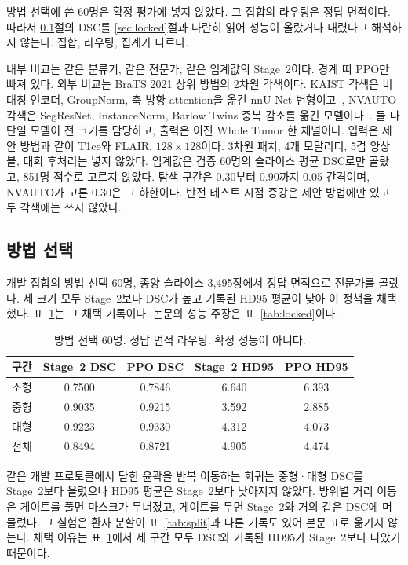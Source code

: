 \documentclass[runningheads]{llncs}
\begin{document}
방법 선택에 쓴 60명은 확정 평가에 넣지 않았다. 그 집합의 라우팅은 정답 면적이다. 따라서 \ref{sec:select}절의 DSC를 \ref{sec:locked}절과 나란히 읽어 성능이 올랐거나 내렸다고 해석하지 않는다. 집합, 라우팅, 집계가 다르다.

내부 비교는 같은 분류기, 같은 전문가, 같은 임계값의 Stage~2이다. 경계 띠 PPO만 빠져 있다. 외부 비교는 BraTS 2021 상위 방법의 2차원 각색이다. KAIST 각색은 비대칭 인코더, GroupNorm, 축 방향 attention을 옮긴 nnU-Net 변형이고~\cite{luu2021}, NVAUTO 각색은 SegResNet, InstanceNorm, Barlow Twins 중복 감소를 옮긴 모델이다~\cite{myronenko2021}. 둘 다 단일 모델이 전 크기를 담당하고, 출력은 이진 Whole Tumor 한 채널이다. 입력은 제안 방법과 같이 T1ce와 FLAIR, $128\times128$이다. 3차원 패치, 4개 모달리티, 5겹 앙상블, 대회 후처리는 넣지 않았다. 임계값은 검증 60명의 슬라이스 평균 DSC로만 골랐고, 851명 점수로 고르지 않았다. 탐색 구간은 0.30부터 0.90까지 0.05 간격이며, NVAUTO가 고른 0.30은 그 하한이다. 반전 테스트 시점 증강은 제안 방법에만 있고 두 각색에는 쓰지 않았다.

\subsection{방법 선택}
\label{sec:select}
개발 집합의 방법 선택 60명, 종양 슬라이스 3{,}495장에서 정답 면적으로 전문가를 골랐다. 세 크기 모두 Stage~2보다 DSC가 높고 기록된 HD95 평균이 낮아 이 정책을 채택했다. 표~\ref{tab:select}는 그 채택 기록이다. 논문의 성능 주장은 표~\ref{tab:locked}이다.

\begin{table}[t]
\caption{방법 선택 60명. 정답 면적 라우팅. 확정 성능이 아니다.}
\label{tab:select}
\centering
\begin{tabular}{lcccc}
\toprule
구간 & Stage~2 DSC & PPO DSC & Stage~2 HD95 & PPO HD95 \\
\midrule
소형 & 0.7500 & 0.7846 & 6.640 & 6.393 \\
중형 & 0.9035 & 0.9215 & 3.592 & 2.885 \\
대형 & 0.9223 & 0.9330 & 4.312 & 4.073 \\
전체 & 0.8494 & 0.8721 & 4.905 & 4.474 \\
\bottomrule
\end{tabular}
\end{table}

같은 개발 프로토콜에서 닫힌 윤곽을 반복 이동하는 회귀는 중형·대형 DSC를 Stage~2보다 올렸으나 HD95 평균은 Stage~2보다 낮아지지 않았다. 방위별 거리 이동은 게이트를 풀면 마스크가 무너졌고, 게이트를 두면 Stage~2와 거의 같은 DSC에 머물렀다. 그 실험은 환자 분할이 표~\ref{tab:split}과 다른 기록도 있어 본문 표로 옮기지 않는다. 채택 이유는 표~\ref{tab:select}에서 세 구간 모두 DSC와 기록된 HD95가 Stage~2보다 나았기 때문이다.
\end{document}

